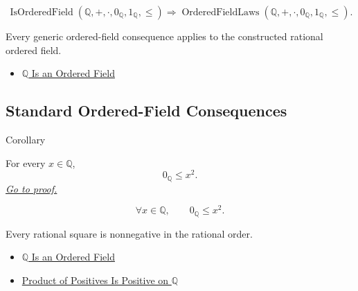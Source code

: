 \begin{remark*}
\[
\operatorname{IsOrderedField}(\mathbb{Q},+,\cdot,0_{\mathbb{Q}},1_{\mathbb{Q}},\le)
\Longrightarrow
\operatorname{OrderedFieldLaws}(\mathbb{Q},+,\cdot,0_{\mathbb{Q}},1_{\mathbb{Q}},\le).
\]
\end{remark*}

\begin{remark*}[Interpretation]
Every generic ordered-field consequence applies to the constructed rational ordered field.
\end{remark*}

\begin{dependencies}
\begin{itemize}
  \item \hyperref[thm:q-is-an-ordered-field]{$\mathbb{Q}$ Is an Ordered Field}
\end{itemize}
\end{dependencies}

\subsection*{Standard Ordered-Field Consequences}

\begin{corollarybox}{Corollary}
\begin{corollary}
\label{cor:squares-nonnegative-on-q}
For every $x\in\mathbb{Q}$,
\[
0_{\mathbb{Q}}\le x^2.
\]
\hyperref[prf:squares-nonnegative-on-q]{\textit{Go to proof.}}
\end{corollary}
\end{corollarybox}

\begin{remark*}
\[
\forall x\in\mathbb{Q},\qquad 0_{\mathbb{Q}}\le x^2.
\]
\end{remark*}

\begin{remark*}[Interpretation]
Every rational square is nonnegative in the rational order.
\end{remark*}

\begin{dependencies}
\begin{itemize}
  \item \hyperref[thm:q-is-an-ordered-field]{$\mathbb{Q}$ Is an Ordered Field}
  \item \hyperref[prop:product-of-positives-is-positive-q]{Product of Positives Is Positive on $\mathbb{Q}$}
\end{itemize}
\end{dependencies}

